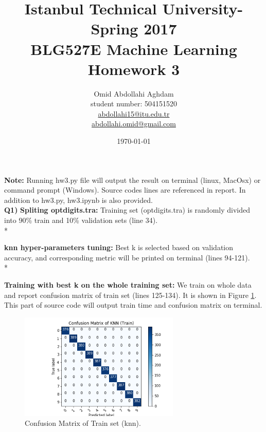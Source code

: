 \documentclass[12pt]{article}
\begin{document}
\title{Istanbul Technical University- Spring 2017 \\ BLG527E Machine Learning \\ Homework 3}
\author{Omid Abdollahi Aghdam \\
student number: 504151520\\
\href{mailto:abdollahi15@itu.edu.tr}{abdollahi15@itu.edu.tr}\\
\href{mailto:abdollahi.omid@gmail.com}{abdollahi.omid@gmail.com}
}
\date{\today}
\maketitle
\newpage
\textbf{Note:} Running hw3.py file will output the result on terminal (linux, MacOsx) or command prompt (Windows). Source codes lines are referenced in report. In addition to hw3.py, hw3.ipynb is also provided.\\

\textbf{Q1)}  
\textbf{Spliting optdigits.tra:} Training set (optdigits.tra) is randomly divided into 90\% train and 10\% validation sets (line 34).\\*

\textbf{knn hyper-parameters tuning:} Best k is selected based on validation accuracy, and corresponding metric will be printed on terminal (lines 94-121).\\*

\textbf{Training with best k on the whole training set:} We train on whole data and report confusion matrix of train set (lines 125-134). It is shown in Figure \ref{fig:knntrain}. This part of source code will output train time and confusion matrix on terminal.
\begin{figure}[h] 
	\begin{center}
		\includegraphics[width=3in]{knntrain.png}
		\caption{Confusion Matrix of Train set (knn).}
		\label{fig:knntrain}
	\end{center}
\end{figure} 
\end{document}
